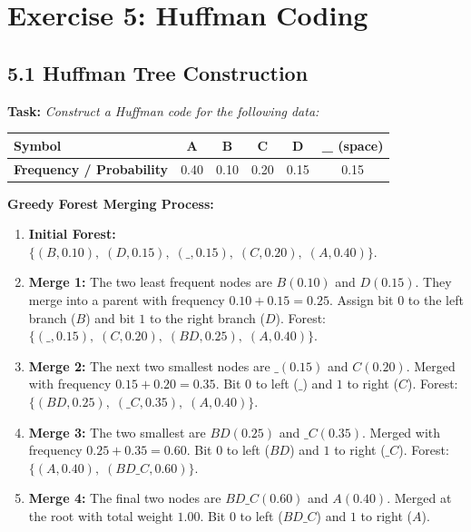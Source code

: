 \documentclass[11pt,a4paper]{article}
\begin{document}
\newpage

\section{Exercise 5: Huffman Coding}

\subsection{5.1 Huffman Tree Construction}
\textbf{Task:} \textit{Construct a Huffman code for the following data:}
\begin{table}[H]
\centering
\begin{tabular}{lccccc}
\toprule
\textbf{Symbol} & \textbf{A} & \textbf{B} & \textbf{C} & \textbf{D} & \textbf{\_} (space) \\
\midrule
\textbf{Frequency / Probability} & 0.40 & 0.10 & 0.20 & 0.15 & 0.15 \\
\bottomrule
\end{tabular}
\end{table}

\noindent \textbf{Greedy Forest Merging Process:}
\begin{enumerate}
    \item \textbf{Initial Forest:} $\{ (B, 0.10), \; (D, 0.15), \; (\_, 0.15), \; (C, 0.20), \; (A, 0.40) \}$.
    \item \textbf{Merge 1:} The two least frequent nodes are $B(0.10)$ and $D(0.15)$. They merge into a parent with frequency $0.10 + 0.15 = 0.25$. Assign bit $0$ to the left branch ($B$) and bit $1$ to the right branch ($D$). Forest: $\{ (\_, 0.15), \; (C, 0.20), \; (BD, 0.25), \; (A, 0.40) \}$.
    \item \textbf{Merge 2:} The next two smallest nodes are $\_(0.15)$ and $C(0.20)$. Merged with frequency $0.15 + 0.20 = 0.35$. Bit $0$ to left ($\_$) and $1$ to right ($C$). Forest: $\{ (BD, 0.25), \; (\_C, 0.35), \; (A, 0.40) \}$.
    \item \textbf{Merge 3:} The two smallest are $BD(0.25)$ and $\_C(0.35)$. Merged with frequency $0.25 + 0.35 = 0.60$. Bit $0$ to left ($BD$) and $1$ to right ($\_C$). Forest: $\{ (A, 0.40), \; (BD\_C, 0.60) \}$.
    \item \textbf{Merge 4:} The final two nodes are $BD\_C(0.60)$ and $A(0.40)$. Merged at the root with total weight $1.00$. Bit $0$ to left ($BD\_C$) and $1$ to right ($A$).
\end{enumerate}
\end{document}
